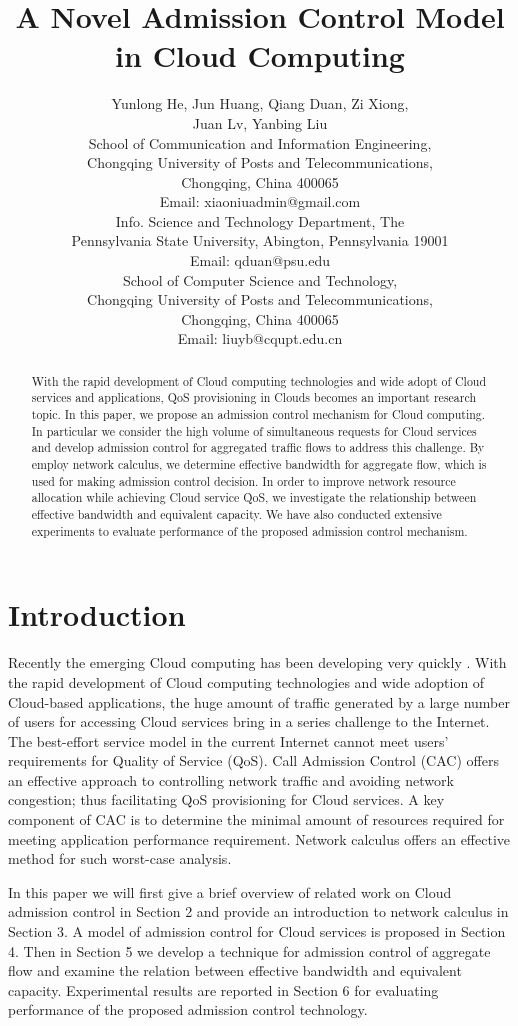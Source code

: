 \documentclass[a4paper]{article}
\title{A Novel Admission Control Model in Cloud Computing}
\author{Yunlong He, Jun Huang, Qiang Duan, Zi Xiong,\\
       Juan Lv, Yanbing Liu\\
       School of Communication and Information Engineering,\\
        Chongqing University of Posts and Telecommunications,\\
        Chongqing, China 400065\\
       Email: xiaoniuadmin@gmail.com\\
       Info. Science and Technology Department, The\\ Pennsylvania
        State University, Abington, Pennsylvania 19001\\
       Email: qduan@psu.edu\\
       School of Computer Science and Technology,\\
        Chongqing University of Posts and Telecommunications,\\
        Chongqing, China 400065\\
       Email: liuyb@cqupt.edu.cn
}
\begin{document}
\maketitle



\begin{abstract}

With the rapid development of Cloud computing technologies and wide adopt of Cloud services and applications, QoS provisioning in Clouds becomes an important research topic. In this paper, we propose an admission control mechanism for Cloud computing. In particular we consider the high volume of simultaneous requests for Cloud services and develop admission control for aggregated traffic flows to address this challenge. By employ network calculus, we determine effective bandwidth for aggregate flow, which is used for making admission control decision. In order to improve network resource allocation while achieving Cloud service QoS, we investigate the relationship between effective bandwidth and equivalent capacity. We have also conducted extensive experiments to evaluate performance of the proposed admission control mechanism.

\end{abstract}

\section{Introduction}

Recently the emerging Cloud computing has been developing very quickly \cite{mishra2013, armbrust2010, ashraf2013}. With the rapid development of Cloud computing technologies and wide adoption of Cloud-based applications, the huge amount of traffic generated by a large number of users for accessing Cloud services bring in a series challenge to the Internet. The best-effort service model in the current Internet cannot meet users’ requirements for Quality of Service (QoS). Call Admission Control (CAC) offers an effective approach to controlling network traffic and avoiding network congestion; thus facilitating QoS provisioning for Cloud services. A key component of CAC is to determine the minimal amount of resources required for meeting application performance requirement. Network calculus offers an effective method for such worst-case analysis.

In this paper we will first give a brief overview of related work on Cloud admission control in Section 2 and provide an introduction to network calculus in Section 3. A model of admission control for Cloud services is proposed in Section 4. Then in Section 5 we develop a technique for admission control of aggregate flow and examine the relation between effective bandwidth and equivalent capacity. Experimental results are reported in Section 6 for evaluating performance of the proposed admission control technology.
\end{document}

